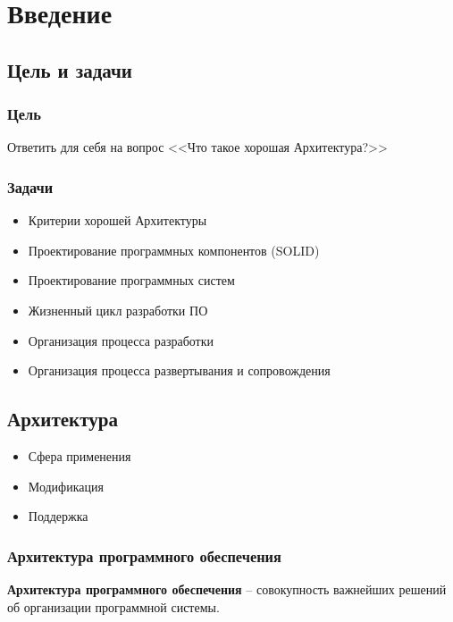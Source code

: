 \chapter{Введение}

\section{Цель и задачи}

\subsection{Цель}

Ответить для себя на вопрос <<Что такое хорошая Архитектура?>>

\subsection{Задачи}

\begin{itemize}
    \item Критерии хорошей Архитектуры
    \item Проектирование программных компонентов (SOLID)
    \item Проектирование программных систем
    \item Жизненный цикл разработки ПО
    \item Организация процесса разработки
    \item Организация процесса развертывания и сопровождения
\end{itemize}

\section{Архитектура}

\begin{itemize}
    \item Сфера применения
    \item Модификация
    \item Поддержка
\end{itemize}

\subsection{Архитектура программного обеспечения}

\textbf{Архитектура программного обеспечения} -- совокупность
важнейших решений об организации программной системы.

